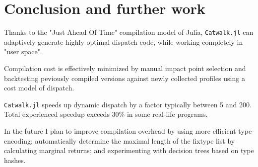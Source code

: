 \documentclass{juliacon}
\begin{document}
\section {Conclusion and further work}

Thanks to the "Just Ahead Of Time" compilation model of Julia, \verb|Catwalk.jl| can adaptively generate highly optimal dispatch code, while working completely in "user space".

Compilation cost is effectively minimized by manual impact point selection and backtesting peviously compiled versions against newly collected profiles using a cost model of dispatch. 

\verb|Catwalk.jl| speeds up dynamic dispatch by a factor typically between 5 and 200. Total experienced speedup exceeds 30\% in some real-life programs.

In the future I plan to improve compilation overhead by using more efficient type-encoding;
automatically determine the maximal length of the fixtype list by calculating marginal returns; and experimenting with decision trees based on type hashes.






























\end{document}
